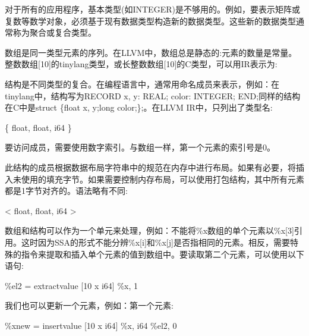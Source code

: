 对于所有的应用程序，基本类型(如INTEGER)是不够用的。例如，要表示矩阵或复数等数学对象，必须基于现有数据类型构造新的数据类型。这些新的数据类型通常称为聚合或复合类型。\par

数组是同一类型元素的序列。在LLVM中，数组总是静态的:元素的数量是常量。整数数组[10]的tinylang类型，或长整数数组[10]的C类型，可以用IR表示为:\par

\begin{tcolorbox}[colback=white,colframe=black]
[10 x i64]
\end{tcolorbox}

结构是不同类型的复合。在编程语言中，通常用命名成员来表示，例如：在tinylang中，结构写为RECORD x, y: REAL; color: INTEGER; END;同样的结构在C中是struct \{float x, y;long color;\};。在LLVM IR中，只列出了类型名:\par

\begin{tcolorbox}[colback=white,colframe=black]
\{ float, float, i64 \}
\end{tcolorbox}

要访问成员，需要使用数字索引。与数组一样，第一个元素的索引号是0。\par

此结构的成员根据数据布局字符串中的规范在内存中进行布局。如果有必要，将插入未使用的填充字节。如果需要控制内存布局，可以使用打包结构，其中所有元素都是1字节对齐的。语法略有不同:\par

\begin{tcolorbox}[colback=white,colframe=black]
<{ float, float, i64 }>
\end{tcolorbox}

数组和结构可以作为一个单元来处理，例如：不能将\%x数组的单个元素以\%x[3]引用。这时因为SSA的形式不能分辨\%x[i]和\%x[j]是否指相同的元素。相反，需要特殊的指令来提取和插入单个元素的值到数组中。要读取第二个元素，可以使用以下语句:\par

\begin{tcolorbox}[colback=white,colframe=black]
\%el2 = extractvalue [10 x i64] \%x, 1
\end{tcolorbox}

我们也可以更新一个元素，例如：第一个元素:\par

\begin{tcolorbox}[colback=white,colframe=black]
\%xnew = insertvalue [10 x i64] \%x, i64 \%el2, 0
\end{tcolorbox}

